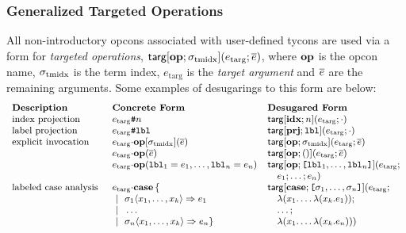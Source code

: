 \documentclass{llncs}
\begin{document}
\subsubsection{Generalized Targeted Operations} 
All non-introductory opcons associated with user-defined tycons are used via a form for \emph{targeted operations}, ${\sf targ}[\textbf{op}; \sigma_\text{tmidx}](e_\text{targ}; \overline{e})$, where $\textbf{op}$ is the opcon name, ${\sigma_\text{tmidx}}$ is the term index, $e_\text{targ}$ is the \emph{target argument} and $\overline{e}$ are the remaining arguments. Some examples of desugarings to this form are below:
\[\small
\begin{array}{lll}
\textbf{Description}& \textbf{Concrete Form}~~~~ & \textbf{Desugared Form}\\
\text{index projection} & e_\text{targ}\texttt{\#}n & \etarg{\opname{idx}}{n}{e_\text{targ}}{\cdot}\\
\text{label projection} & e_\text{targ}\texttt{\#}\conclbl{lbl} & \etarg{\opname{prj}}{\conclbl{lbl}}{e_\text{targ}}{\cdot}\\
\text{explicit invocation}~~~~ & e_\text{targ}{\cdot}\opname{op}[\sttmidx](\es) & \etarg{\opname{op}}{\sttmidx}{e_\text{targ}}{\es}\\
& e_\text{targ}{\cdot}\opname{op}(\es) & \etarg{\opname{op}}{()}{e_\text{targ}}{\es}\\
& e_\text{targ}{\cdot}\opname{op}(\conclbl{lbl}_1=e_1, \ldots, \conclbl{lbl}_n=e_n) & \keyw{targ}[\opname{op}; \texttt{[}\conclbl{lbl}_1, \ldots, \conclbl{lbl}_n\texttt{]}](e_\text{targ}; \\
& & \quad e_1; \ldots; e_n)\\
\text{labeled case analysis} & e_\text{targ}{\cdot}\opname{case}\,\{ & \keyw{targ}[{\opname{case}}; {\texttt{[}\st_1, \ldots, \st_n\texttt{]}}]({e_\text{targ}}; \\
 & ~|~~\st_1\langle x_1, \ldots, x_k \rangle \Rightarrow e_1 & \quad \eanalam{x_1}{\ldots \eanalam{x_k}{e_1}};\\
 & ~|~~\ldots & \quad \ldots;\\ 
 & ~|~~\st_n\langle x_1, \ldots, x_k \rangle \Rightarrow e_n\} & \quad \eanalam{x_1}{\ldots \eanalam{x_k}{e_n}})
\end{array}
\]
\end{document}
